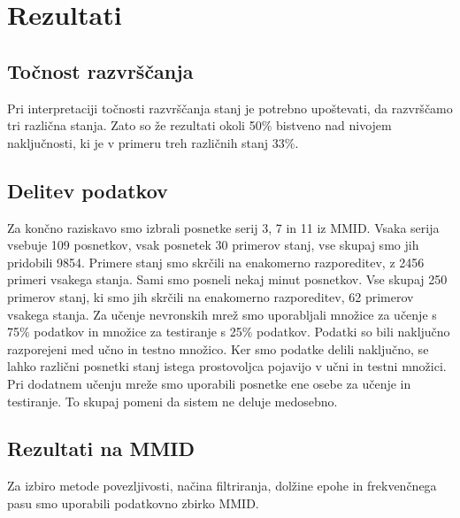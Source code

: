 \chapter{Rezultati}
\section{Točnost razvrščanja}
Pri interpretaciji točnosti razvrščanja stanj je potrebno upoštevati, da razvrščamo tri različna stanja. Zato so že rezultati okoli 50\% bistveno nad nivojem naključnosti, ki je v primeru treh različnih stanj 33\%.
\section{Delitev podatkov}
Za končno raziskavo smo izbrali posnetke serij 3, 7 in 11 iz MMID. Vsaka serija vsebuje 109 posnetkov, vsak posnetek 30 primerov stanj, vse skupaj smo jih pridobili 9854. Primere stanj smo skrčili na enakomerno razporeditev, z 2456 primeri vsakega stanja. Sami smo posneli nekaj minut posnetkov. Vse skupaj 250 primerov stanj, ki smo jih skrčili na enakomerno razporeditev, 62 primerov vsakega stanja. Za učenje nevronskih mrež smo uporabljali množice za učenje s 75\% podatkov in množice za testiranje s 25\% podatkov. Podatki so bili naključno razporejeni med učno in testno množico. Ker smo podatke delili naključno, se lahko različni posnetki stanj istega prostovoljca pojavijo v učni in testni množici. Pri dodatnem učenju mreže smo uporabili posnetke ene osebe za učenje in testiranje. To skupaj pomeni da sistem ne deluje medosebno.


\section{Rezultati na MMID}
Za izbiro metode povezljivosti, načina filtriranja, dolžine epohe in frekvenčnega pasu smo uporabili podatkovno zbirko MMID.

